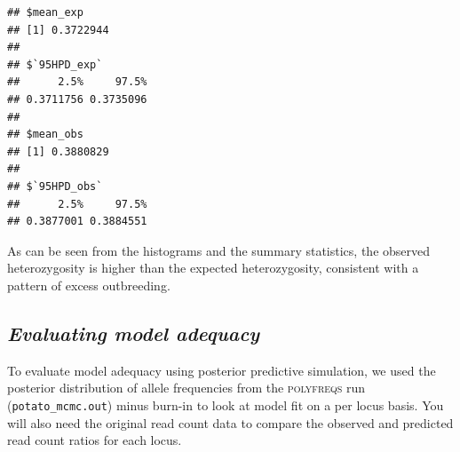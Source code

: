 \documentclass[]{article}
\newenvironment{Shaded}{\begin{snugshade}}{\end{snugshade}}
\newcommand{\KeywordTok}[1]{\textcolor[rgb]{0.13,0.29,0.53}{\textbf{{#1}}}}
\newcommand{\FloatTok}[1]{\textcolor[rgb]{0.00,0.00,0.81}{{#1}}}
\newcommand{\StringTok}[1]{\textcolor[rgb]{0.31,0.60,0.02}{{#1}}}
\newcommand{\CommentTok}[1]{\textcolor[rgb]{0.56,0.35,0.01}{\textit{{#1}}}}
\newcommand{\NormalTok}[1]{{#1}}
\begin{document}
\begin{Shaded}
\end{Shaded}

\begin{verbatim}
## $mean_exp
## [1] 0.3722944
## 
## $`95HPD_exp`
##      2.5%     97.5% 
## 0.3711756 0.3735096 
## 
## $mean_obs
## [1] 0.3880829
## 
## $`95HPD_obs`
##      2.5%     97.5% 
## 0.3877001 0.3884551
\end{verbatim}

As can be seen from the histograms and the summary statistics, the
observed heterozygosity is higher than the expected heterozygosity,
consistent with a pattern of excess outbreeding.

\subsection{\texorpdfstring{\emph{Evaluating model
adequacy}}{Evaluating model adequacy}}\label{evaluating-model-adequacy}

To evaluate model adequacy using posterior predictive simulation, we
used the posterior distribution of allele frequencies from the
\textsc{polyfreqs} run (\texttt{potato\_mcmc.out}) minus burn-in to look
at model fit on a per locus basis. You will also need the original read
count data to compare the observed and predicted read count ratios for
each locus.
\end{document}
